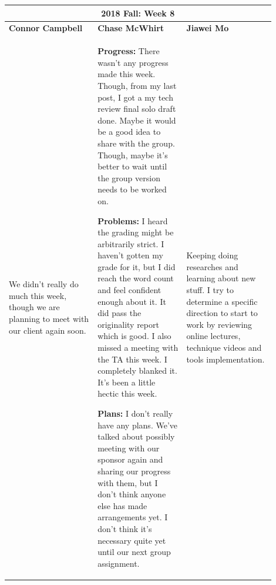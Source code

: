 \documentclass[10pt,journal,compsoc, draftclsnofoot,onecolumn]{IEEEtran}
\begin{document}
\begin{center}
\begin{tabular}{|p{0.3\linewidth}|p{0.3\linewidth}|p{0.3\linewidth}|}
\hline
\multicolumn{3}{|c|}{\textbf{2018 Fall: Week 8}} \\
\hline
\textbf{Connor Campbell} & \textbf{Chase McWhirt} & \textbf{Jiawei Mo} \\ [0.5ex]
\hline\hline

We didn't really do much this week, though we are planning to meet with our client again soon.
&
\textbf{Progress:} There wasn't any progress made this week.
Though, from my last post, I got a my tech review final solo draft done.
Maybe it would be a good idea to share with the group.
Though, maybe it's better to wait until the group version needs to be worked on.

\textbf{Problems:} I heard the grading might be arbitrarily strict.
I haven't gotten my grade for it, but I did reach the word count and feel confident enough about it.
It did pass the originality report which is good.
I also missed a meeting with the TA this week.
I completely blanked it.
It's been a little hectic this week.

\textbf{Plans:} I don't really have any plans.
We've talked about possibly meeting with our sponsor again and sharing our progress with them, but I don't think anyone else has made arrangements yet.
I don't think it's necessary quite yet until our next group assignment.
&
Keeping doing researches and learning about new stuff. I try to determine a specific direction to start to work by reviewing online lectures, technique videos and tools implementation.
\\ \hline
\end{tabular}
\end{center}
\end{document}
